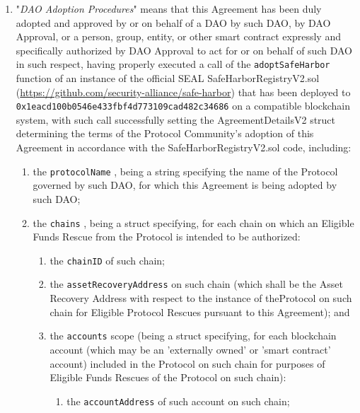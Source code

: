 \documentclass{article}
\newcommand{\code}[1]{%
    \colorbox{red!10}{\textcolor{orange!80!black}{\texttt{#1}}}%
}
\begin{document}
\begin{enumerate}
    \item "\textit{DAO Adoption Procedures}" means that this Agreement has been duly adopted and approved by or on behalf of a DAO by such DAO, by DAO Approval, or a person, group, entity, or other smart contract expressly and specifically authorized by DAO Approval to act for or on behalf of such DAO in such respect, having properly executed a call of the \code{adoptSafeHarbor} function of an instance of the official SEAL SafeHarborRegistryV2.sol (\url{https://github.com/security-alliance/safe-harbor}) that has been deployed to \code{0x1eacd100b0546e433fbf4d773109cad482c34686} on a compatible blockchain system, with such call successfully setting the AgreementDetailsV2 struct determining the terms of the Protocol Community's adoption of this Agreement in accordance with the SafeHarborRegistryV2.sol code, including:

          \begin{enumerate}
              \item the \code{protocolName}, being a string specifying the name of the Protocol governed by such DAO, for which this Agreement is being adopted by such DAO;

              \item the \code{chains}, being a struct specifying, for each chain on which an Eligible Funds Rescue from the Protocol is intended to be authorized:

                    \begin{enumerate}
                        \item the \code{chainID} of such chain;

                        \item the \code{assetRecoveryAddress} on such chain (which shall be the Asset Recovery Address with respect to the instance of theProtocol on such chain for Eligible Protocol Rescues pursuant to this Agreement); and

                        \item the \code{accounts} scope (being a struct specifying, for each blockchain account (which may be an 'externally owned' or 'smart contract' account) included in the Protocol on such chain for purposes of Eligible Funds Rescues of the Protocol on such chain):

                              \begin{enumerate}
                                  \item the \code{accountAddress} of such account on such chain;


\end{enumerate}
\end{enumerate}
\end{enumerate}
\end{enumerate}
\end{document}

